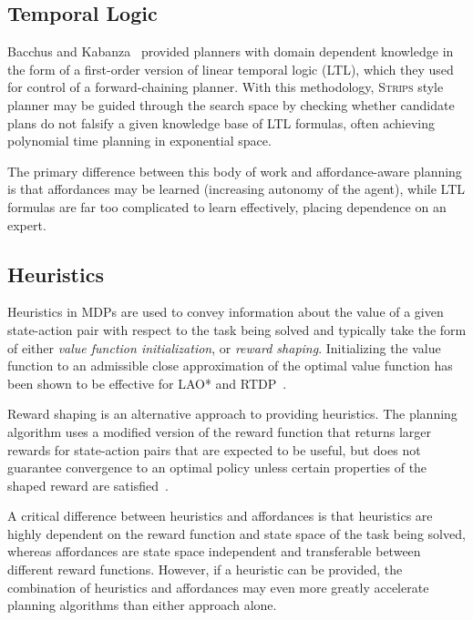 \documentclass[letterpaper]{article}
\begin{document}
\subsection{Temporal Logic}

Bacchus and Kabanza~\cite{Bacchus95usingtemporal, Bacchus99usingtemporal} provided
planners with domain dependent knowledge in the form of a first-order version of linear
temporal logic (LTL), which they used for control of a forward-chaining planner. With this methodology, 
\textsc{Strips} style planner may be guided through the search space by checking 
whether candidate plans do not falsify a given knowledge base of LTL formulas, often
achieving polynomial time planning in exponential space.

The primary difference between this body of work and affordance-aware planning is that affordances may be learned (increasing autonomy of the agent), while LTL formulas are far too complicated to learn effectively, placing dependence on an expert.

\subsection{Heuristics}
Heuristics in MDPs are used to convey information about the value of a given state-action pair with respect to the task being solved and typically take the form of either {\em value function initialization},
or {\em reward shaping}. Initializing the value function to an admissible close approximation of the optimal value function has been shown to be effective for LAO* and RTDP~\cite{Hansen:1999qf}.

Reward shaping is an alternative approach to providing heuristics. The planning algorithm uses a modified version of the reward function that returns larger rewards for state-action pairs that are expected to be useful, but does not guarantee convergence to an optimal policy unless certain properties of the shaped reward are satisfied~\cite{potshap}.

A critical difference between heuristics and affordances is that heuristics are highly dependent on the reward function and state space of the task being solved, whereas affordances are state space independent and transferable between different reward functions. However, if a heuristic can be provided, the combination of heuristics and affordances may even more greatly accelerate planning algorithms than either approach alone.
\end{document}

